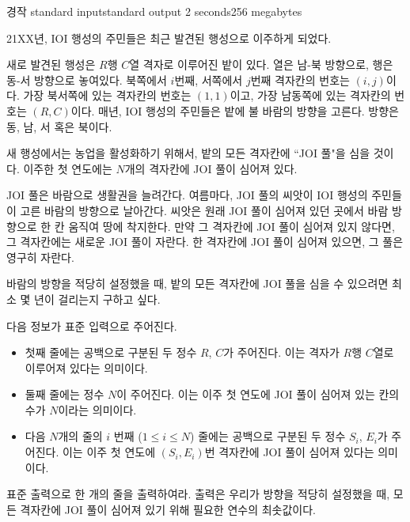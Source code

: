 \begin{problem}{경작}
	{standard input}{standard output}
	{2 seconds}{256 megabytes}{}
	
	21XX년, IOI 행성의 주민들은 최근 발견된 행성으로 이주하게 되었다.
	
	새로 발견된 행성은 $R$행 $C$열 격자로 이루어진 밭이 있다. 열은 남-북 방향으로, 행은 동-서 방향으로 놓여있다. 북쪽에서 $i$번째, 서쪽에서 $j$번째 격자칸의 번호는 $(i, j)$이다. 가장 북서쪽에 있는 격자칸의 번호는 $(1, 1)$이고, 가장 남동쪽에 있는 격자칸의 번호는 $(R, C)$이다. 매년, IOI 행성의 주민들은 밭에 불 바람의 방향을 고른다. 방향은 동, 남, 서 혹은 북이다.
	
	새 행성에서는 농업을 활성화하기 위해서, 밭의 모든 격자칸에 ``JOI 풀"을 심을 것이다. 이주한 첫 연도에는 $N$개의 격자칸에 JOI 풀이 심어져 있다.
	
	JOI 풀은 바람으로 생활권을 늘려간다. 여름마다, JOI 풀의 씨앗이 IOI 행성의 주민들이 고른 바람의 방향으로 날아간다. 씨앗은 원래 JOI 풀이 심어져 있던 곳에서 바람 방향으로 한 칸 움직여 땅에 착지한다. 만약 그 격자칸에 JOI 풀이 심어져 있지 않다면, 그 격자칸에는 새로운 JOI 풀이 자란다. 한 격자칸에 JOI 풀이 심어져 있으면, 그 풀은 영구히 자란다.
	
	바람의 방향을 적당히 설정했을 때, 밭의 모든 격자칸에 JOI 풀을 심을 수 있으려면 최소 몇 년이 걸리는지 구하고 싶다.
	

	\InputFile
	
	다음 정보가 표준 입력으로 주어진다.
	
	\begin{itemize}
		\item 첫째 줄에는 공백으로 구분된 두 정수 $R$, $C$가 주어진다. 이는 격자가 $R$행 $C$열로 이루어져 있다는 의미이다.
		\item 둘째 줄에는 정수 $N$이 주어진다. 이는 이주 첫 연도에 JOI 풀이 심어져 있는 칸의 수가 $N$이라는 의미이다.
		\item 다음 $N$개의 줄의 $i$ 번째 ($1 \le i \le N$) 줄에는 공백으로 구분된 두 정수 $S_i$, $E_i$가 주어진다. 이는 이주 첫 연도에 $(S_i, E_i)$번 격자칸에 JOI 풀이 심어져 있다는 의미이다.
	\end{itemize}

	
	\OutputFile
	
	표준 출력으로 한 개의 줄을 출력하여라. 출력은 우리가 방향을 적당히 설정했을 때, 모든 격자칸에 JOI 풀이 심어져 있기 위해 필요한 연수의 최솟값이다.
	
	\Constraints
	
	\begin{itemize}
	

\end{itemize}
\end{problem}
